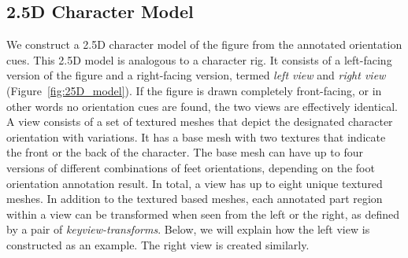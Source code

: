 \subsection{2.5D Character Model}
\label{sec:model}
We construct a 2.5D character model of the figure from the annotated orientation cues. This 2.5D model is analogous to a character rig. It consists of a left-facing version of the figure and a right-facing version, termed \textit{left view} and \textit{right view} (Figure~\ref{fig:25D_model}). If the figure is drawn completely front-facing, or in other words no orientation cues are found, the two views are effectively identical. A view consists of a set of textured meshes that depict the designated character orientation with variations. It has a base mesh with two textures that indicate the front or the back of the character. The base mesh can have up to four versions of different combinations of feet orientations, depending on the foot orientation annotation result. In total, a view has up to eight unique textured meshes. In addition to the textured based meshes, each annotated part region within a view can be transformed when seen from the left or the right, as defined by a pair of \textit{keyview-transforms}. Below, we will explain how the left view is constructed as an example. The right view is created similarly.

\begin{comment}
\subsubsection{Generate2.5DCharacter}
We begin by computing a 2D textured mesh for each half's masks and front-back texture pairs. 
While the plane containing these meshes will rotate within 3D space, the meshes themselves remain 2D.
Each mesh is registered as the 'rest shape' for As-Rigid-As-Possible Shape Manipulation~\cite{igarashi2005asrigidaspossible}.
Each keypoint is used to initially place a control handle upon the mesh, which we collectively refer to as the \textit{character rig}.
Each triangle within a mesh is mapped to the closest bone, providing a rough segmentation that is later used to determine render order.

We similarly create 2D textured meshes for each part region.
For translating part regions, we use the keyview-transform pairs to compute a series of \textit{attachment points} upon the parent mesh.
Each attachment point consists of two barycentric coordinates within a mesh triangle and is later used to determine the translation and local rotation that matches mesh after it is deformed.
\end{comment}

